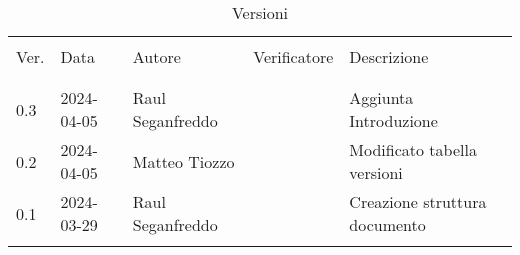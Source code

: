 \documentclass[italian,12pt]{article} %
\begin{document}


\newpage



\begin{table}[!h]
	\footnotesize
	\begin{center}
		\caption*{Versioni}
		\vspace{0.5cm}
		\begin{tabular}{ l l l l p{6cm} }
			\hline                                                                                \\[-2ex]
			Ver. & Data       & Autore           & Verificatore   & Descrizione                   \\
			\\[-2ex] \hline \\[-1.5ex]
			0.3  & 2024-04-05 & Raul Seganfreddo &                & Aggiunta Introduzione         \\
			0.2  & 2024-04-05 & Matteo Tiozzo    &                & Modificato tabella versioni   \\
			0.1  & 2024-03-29 & Raul Seganfreddo &                & Creazione struttura documento \\
			\\[-1.5ex] \hline
		\end{tabular}
	\end{center}
\end{table}

\newpage

\tableofcontents

\listoftables

\listoffigures

\newpage



\newpage



\newpage



\newpage



\newpage




\newpage




\newpage
\end{document}
